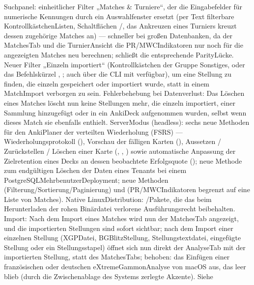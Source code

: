 \documentclass[letterpaper,10pt,german]{sphinxmanual}
\begin{document}
\begin{savenotes}
\begin{longtable}{}
\begin{varwidth}[t]{}
\sphinxAtStartPar
Suchpanel: einheitlicher Filter „Matches \& Turniere“, der die Eingabefelder für numerische Kennungen durch ein Auswahlfenster ersetzt (per Text filterbare Kontrollkästchen\sphinxhyphen{}Listen, Schaltflächen /, das Ankreuzen eines Turniers kreuzt dessen zugehörige Matches an) — schneller bei großen Datenbanken, da der Matches\sphinxhyphen{}Tab und die Turnier\sphinxhyphen{}Ansicht die PR/MWC\sphinxhyphen{}Indikatoren nur noch für die angezeigten Matches neu berechnen;  schließt die entsprechende Parity\sphinxhyphen{}Lücke. Neuer Filter „Einzeln importiert“ (Kontrollkästchen der Gruppe Sonstiges, oder das Befehlskürzel , ; auch über die CLI mit  verfügbar), um eine Stellung zu finden, die einzeln gespeichert oder importiert wurde, statt in einem Match\sphinxhyphen{}Import verborgen zu sein. Fehlerbehebung bei Datenverlust: Das Löschen eines Matches löscht nun keine Stellungen mehr, die einzeln importiert, einer Sammlung hinzugefügt oder in ein Anki\sphinxhyphen{}Deck aufgenommen wurden, selbst wenn dieses Match sie ebenfalls enthielt. Server\sphinxhyphen{}Modus (headless): sechs neue Methoden für den Anki\sphinxhyphen{}Planer der verteilten Wiederholung (FSRS) — Wiederholungsprotokoll (), Vorschau der fälligen Karten (), Aussetzen / Zurückstellen / Löschen einer Karte (, , ) sowie automatische Anpassung der Zielretention eines Decks an dessen beobachtete Erfolgsquote (); neue Methode  zum endgültigen Löschen der Daten eines Tenants bei einem PostgreSQL\sphinxhyphen{}Mehrbenutzer\sphinxhyphen{}Deployment; neue Methoden  (Filterung/Sortierung/Paginierung) und  (PR/MWC\sphinxhyphen{}Indikatoren begrenzt auf eine Liste von Matches). Native Linux\sphinxhyphen{}Distribution: \sphinxhyphen{}/\sphinxhyphen{}Pakete, die das beim Herunterladen der rohen Binärdatei verlorene Ausführungsrecht beibehalten. Import: Nach dem Import eines Matches wird nun der Matches\sphinxhyphen{}Tab angezeigt, und die importierten Stellungen sind sofort sichtbar; nach dem Import einer einzelnen Stellung (XGP\sphinxhyphen{}Datei, BGBlitz\sphinxhyphen{}Stellung, Stellungstextdatei, eingefügte Stellung oder ein Stellungsstapel) öffnet sich nun direkt der Analyse\sphinxhyphen{}Tab mit der importierten Stellung, statt des Matches\sphinxhyphen{}Tabs; behoben: das Einfügen einer französischen oder deutschen eXtreme\sphinxhyphen{}Gammon\sphinxhyphen{}Analyse von macOS aus, das leer blieb (durch die Zwischenablage des Systems zerlegte Akzente). Siehe 
\end{varwidth}
\end{longtable}
\end{savenotes}
\end{document}
